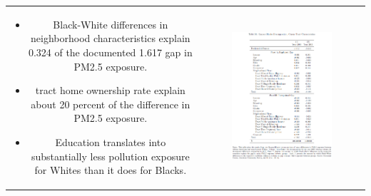 \documentclass[dvipdfmx,12pt]{beamer}
\begin{document}
\begin{frame}{}
  \begin{table}
    \begin{tabular}{cc}
      \begin{minipage}{.4\textwidth}
        \begin{itemize}
          \item Black-White differences in neighborhood characteristics explain 0.324 of the documented 1.617 gap in PM2.5 exposure.
          \item tract home ownership rate explain about 20 percent of the difference in PM2.5 exposure.
          \item Education translates into substantially less pollution exposure for Whites than it does for Blacks.
        \end{itemize}
      \end{minipage} &
      \begin{minipage}{.6\textwidth}
        \begin{figure}
          \centering
          \includegraphics[scale = .4]{TB6.png}
        \end{figure}
      \end{minipage}
    \end{tabular}
  \end{table}
\end{frame}
\end{document}
